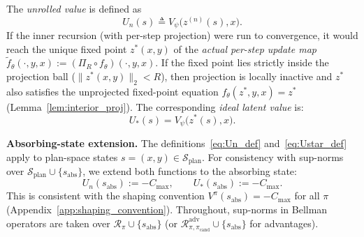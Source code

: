\documentclass{article}
\theoremstyle{plain}
\theoremstyle{definition}
\theoremstyle{remark}
\newtheorem{remark}[theorem]{Remark}
\newcommand{\longonly}[1]{}
\newcommand{\longonly}[1]{#1}
\newcommand{\SSS}{\mathcal{S}}
\begin{document}
{The \emph{unrolled value} is defined as
\begin{equation}
    U_n(s)
    \triangleq
    V_\psi\bigl(z^{(n)}(s),x\bigr).
    \label{eq:Un_def}
\end{equation}
If the inner recursion (with per-step projection) were run to convergence, it would reach the unique fixed point
$z^*(x,y)$ of the \emph{actual per-step update map} $\tilde f_\theta(\cdot,y,x) := (\Pi_R\circ f_\theta)(\cdot,y,x)$.
If the fixed point lies strictly inside the projection ball ($\|z^*(x,y)\|_2 < R$), then projection is locally inactive and $z^*$ also satisfies the unprojected fixed-point equation $f_\theta(z^*,y,x)=z^*$ (Lemma~\ref{lem:interior_proj}).
The corresponding \emph{ideal latent value} is:
\begin{equation}
    U_*(s) = V_\psi\bigl(z^*(s),x\bigr).
    \label{eq:Ustar_def}
\end{equation}

\textbf{Absorbing-state extension.}
The definitions~\eqref{eq:Un_def} and~\eqref{eq:Ustar_def} apply to plan-space states $s=(x,y)\in\SSS_{\mathrm{plan}}$.
For consistency with sup-norms over $\SSS_{\mathrm{plan}}\cup\{s_{\mathrm{abs}}\}$, we extend both functions to the absorbing state:
\begin{equation}
U_n(s_{\mathrm{abs}}) := -C_{\max}, \qquad U_*(s_{\mathrm{abs}}) := -C_{\max}.
\label{eq:U_sabs_extension}
\end{equation}
This is consistent with the shaping convention $V^\pi(s_{\mathrm{abs}})=-C_{\max}$ for all $\pi$ (Appendix~\ref{app:shaping_convention}).
Throughout, sup-norms in Bellman operators are taken over $\mathcal{R}_\pi \cup \{s_{\mathrm{abs}}\}$ (or $\mathcal{R}_{\pi,\pi_{\mathrm{cand}}}^{\mathrm{adv}} \cup \{s_{\mathrm{abs}}\}$ for advantages).

\longonly{
\begin{sloppypar}
\begin{remark}[Conceptual vs.\ computable quantities]
\label{rem:conceptual}
$U_*$ equals $V^\pi$ only if $(f_\theta, V_\psi)$ exactly matches the true value function; in general $\|U_* - V^\pi\|_\infty$ is an architectural approximation error.
The quantity $U_*$ is a \emph{conceptual tool} for separating approximation error from unrolling bias---we cannot compute it directly.
In practice, one monitors the empirical $K$-step residual of $U_n$ as a proxy: if the residual is small and $n$ is large (so $\|U_n - U_*\|$ is small by Proposition~\ref{prop:banach}), Lemma~\ref{lem:residual_transfer} implies the architectural residual is also small.
\end{remark}

The resulting picture is generalized policy iteration in plan-space: train $(f_\theta,V_\psi)$ so $U_n\approx V^\pi$, then update $\pi_\phi$ via advantages.
\end{sloppypar}
}%
}%
\end{document}
